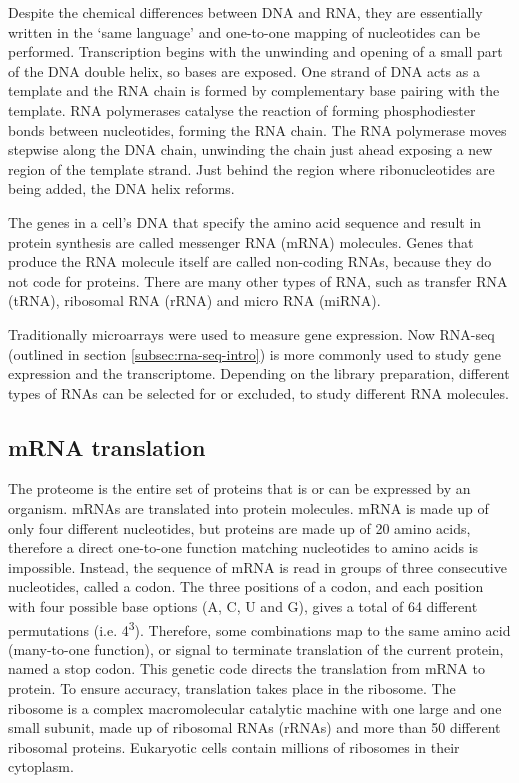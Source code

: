 Despite the chemical differences between DNA and RNA, they are essentially written in the `same language' and one-to-one mapping of nucleotides can be performed.
Transcription begins with the unwinding and opening of a small part of the DNA double helix, so bases are exposed.
One strand of DNA acts as a template and the RNA chain is formed by complementary base pairing with the template.
RNA polymerases catalyse the reaction of forming phosphodiester bonds between nucleotides, forming the RNA chain.
The RNA polymerase moves stepwise along the DNA chain, unwinding the chain just ahead exposing a new region of the template strand.
Just behind the region where ribonucleotides are being added, the DNA helix reforms.

The genes in a cell's DNA that specify the amino acid sequence and result in protein synthesis are called messenger RNA (mRNA) molecules.
Genes that produce the RNA molecule itself are called non-coding RNAs, because they do not code for proteins.
There are many other types of RNA, such as transfer RNA (tRNA), ribosomal RNA (rRNA) and micro RNA (miRNA).

Traditionally microarrays were used to measure gene expression.
Now RNA-seq (outlined in section  \ref{subsec:rna-seq-intro}) is more commonly used to study gene expression and the transcriptome.
Depending on the library preparation, different types of RNAs can be selected for or excluded, to study different RNA molecules.

\subsection{mRNA translation}\label{subsec:translation}
The proteome is the entire set of proteins that is or can be expressed by an organism.
mRNAs are translated into protein molecules.
mRNA is made up of only four different nucleotides, but proteins are made up of 20 amino acids, therefore a direct one-to-one function matching nucleotides to amino acids is impossible.
Instead, the sequence of mRNA is read in groups of three consecutive nucleotides, called a codon.
The three positions of a codon, and each position with four possible base options (A, C, U and G), gives a total of 64 different permutations (i.e. 4\textsuperscript{3}).
Therefore, some combinations map to the same amino acid (many-to-one function), or signal to terminate translation of the current protein, named a stop codon.
This genetic code directs the translation from mRNA to protein.
To ensure accuracy, translation takes place in the ribosome.
The ribosome is a complex macromolecular catalytic machine with one large and one small subunit, made up of ribosomal RNAs (rRNAs) and more than 50 different ribosomal proteins\cite{alberts2007molecular}.
Eukaryotic cells contain millions of ribosomes in their cytoplasm.

